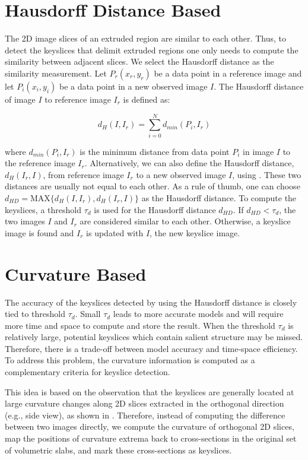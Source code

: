 \section{Hausdorff Distance Based}
\label{sec:ksd}
The 2D image slices of an extruded region are similar to each other.
Thus, to detect the keyslices that delimit extruded regions one only needs
to compute the similarity between adjacent slices.
We select the Hausdorff distance \cite{IR_HKR} as the similarity measurement.
Let $P_r(x_r, y_r)$ be a data point in a reference image and
let $P_i(x_i, y_i)$ be a data point in a new observed image $I$.
The Hausdorff distance of image $I$ to reference image $I_r$ is defined as:

\begin{equation}
d_H(I, I_r) = \sum_{i=0}^Nd_{min}(P_i, I_r)
\label{eq:hd}
\end{equation}

where $d_{min}(P_i, I_r)$ is the minimum distance from data point $P_i$
in image $I$ to the reference image $I_r$.
Alternatively, we can also define the Hausdorff distance, $d_H(I_r, I)$,
from reference image $I_r$ to a new observed image $I$, using .
These two distances are usually not equal to each other.
As a rule of thumb, one can choose
$d_{HD} = \text{MAX}\{d_H(I, I_r), d_H(I_r, I)\}$ as the Hausdorff distance.
To compute the keyslices, a threshold $\tau_{d}$ is used for the
Hausdorff distance $d_{HD}$.
If $d_{HD} < \tau_{d}$, the two images $I$ and $I_r$ are considered
similar to each other.
Otherwise, a keyslice image is found and $I_r$ is updated with $I$,
the new keyslice image.

\section{Curvature Based}
The accuracy of the keyslices detected by using the Hausdorff distance
is closely tied to threshold $\tau_d$.
Small $\tau_d$ leads to more accurate models and will require more time and
space to compute and store the result.
When the threshold $\tau_d$ is relatively large, potential keyslices which
contain salient structure may be missed.
Therefore, there is a trade-off between model accuracy and time-space
efficiency.
To address this problem, the curvature information is computed as a
complementary criteria for keyslice detection.

This idea is based on the observation that the keyslices are generally
located at large curvature changes along 2D slices extracted in the orthogonal
direction (e.g., side view), as shown in .
Therefore, instead of computing the difference between two images directly,
we compute the curvature of orthogonal 2D slices, map the positions of
curvature extrema back to cross-sections in the original set of volumetric
slabs, and mark these cross-sections as keyslices.

